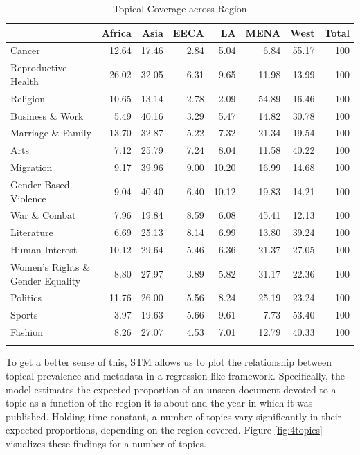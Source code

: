 \documentclass[11pt, oneside]{article}
\newcommand\T{\rule{0pt}{2.6ex}}       %
\newcommand\B{\rule[-1.2ex]{0pt}{0pt}} %
\begin{document}
\begin{table}[ht]
\centering
\vspace{.5cm}
\caption{Topical Coverage across Region}\label{table:region-distr}
\begin{tabular}{lrrrrrrr}
  \hline
 & Africa & Asia & EECA & LA & MENA & West & Total \T\B \\  
  \hline
Cancer & 12.64 & 17.46 & 2.84 & 5.04 & 6.84 & 55.17 & 100 \\ 
  Reproductive Health & 26.02 & 32.05 & 6.31 & 9.65 & 11.98 & 13.99 & 100 \\ 
  Religion & 10.65 & 13.14 & 2.78 & 2.09 & 54.89 & 16.46 & 100 \\ 
  Business \& Work & 5.49 & 40.16 & 3.29 & 5.47 & 14.82 & 30.78 & 100 \\ 
  Marriage \& Family & 13.70 & 32.87 & 5.22 & 7.32 & 21.34 & 19.54 & 100 \\ 
  Arts & 7.12 & 25.79 & 7.24 & 8.04 & 11.58 & 40.22 & 100 \\ 
  Migration & 9.17 & 39.96 & 9.00 & 10.20 & 16.99 & 14.68 & 100 \\ 
  Gender-Based Violence & 9.04 & 40.40 & 6.40 & 10.12 & 19.83 & 14.21 & 100 \\ 
  War \& Combat & 7.96 & 19.84 & 8.59 & 6.08 & 45.41 & 12.13 & 100 \\ 
  Literature & 6.69 & 25.13 & 8.14 & 6.99 & 13.80 & 39.24 & 100 \\ 
  Human Interest & 10.12 & 29.64 & 5.46 & 6.36 & 21.37 & 27.05 & 100 \\ 
  Women's Rights \& Gender Equality & 8.80 & 27.97 & 3.89 & 5.82 & 31.17 & 22.36 & 100 \\ 
  Politics & 11.76 & 26.00 & 5.56 & 8.24 & 25.19 & 23.24 & 100 \\ 
  Sports & 3.97 & 19.63 & 5.66 & 9.61 & 7.73 & 53.40 & 100 \\ 
  Fashion & 8.26 & 27.07 & 4.53 & 7.01 & 12.79 & 40.33 & 100 \\ 
   \hline
   \vspace{.5cm}
\end{tabular}
\end{table}

To get a better sense of this, STM allows us to plot the relationship between topical prevalence and metadata in a regression-like framework. Specifically, the model estimates the expected proportion of an unseen document devoted to a topic as a function of the region it is about and the year in which it was published. Holding time constant, a number of topics vary significantly in their expected proportions, depending on the region covered. Figure \ref{fig:4topics} visualizes these findings for a number of topics.
\end{document}
